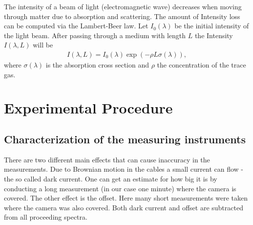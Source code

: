 \documentclass[12pt, a4paper, bibliography=totoc]{scrartcl}
\begin{document}
\begin{multicols}{2}
The intensity of a beam of light (electromagnetic wave) decreases when moving through matter due to absorption and scattering.
The amount of Intensity loss can be computed via the Lambert-Beer law.
    Let $I_0 (\lambda)$ be the initial intensity of the light beam. 
    After passing through a medium with length $L$ the Intensity $I(\lambda, L)$ will be
    \begin{align}
        I(\lambda, L) = I_0 (\lambda) \exp (- \rho L \sigma (\lambda)),
    \end{align}
    where $\sigma (\lambda)$ is the absorption cross section and $\rho$ the concentration of the trace gas.


\section{Experimental Procedure}
\subsection{Characterization of the measuring instruments}
 
    There are two different main effects that can cause inaccuracy in the measurements.
Due to Brownian motion in the cables a small current can flow - the so called dark current.
    One can get an estimate for how big it is by conducting a long measurement (in our case one minute) where the camera is covered.
The other effect is the offset.
Here many short measurements were taken where the camera was also covered.
Both dark current and offset are subtracted from all proceeding spectra.



\end{multicols}
\end{document}
